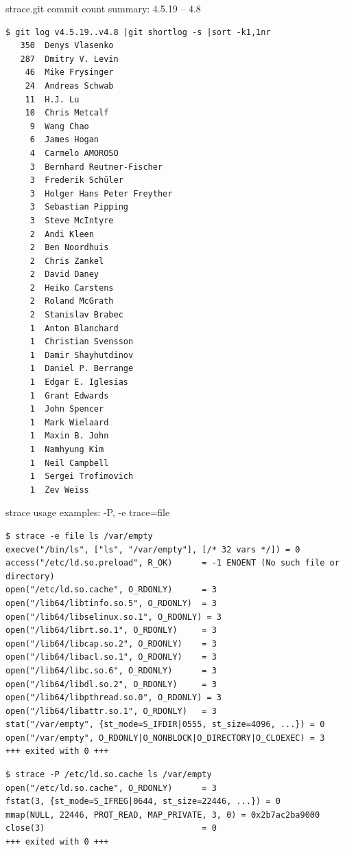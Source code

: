 \documentclass[unicode]{beamer}
\begin{document}
\begin{frame}[fragile]{strace.git commit count summary: 4.5.19 -- 4.8}
\scriptsize
\begin{verbatim}
$ git log v4.5.19..v4.8 |git shortlog -s |sort -k1,1nr
   350	Denys Vlasenko
   287	Dmitry V. Levin
    46	Mike Frysinger
    24	Andreas Schwab
    11	H.J. Lu
    10	Chris Metcalf
     9	Wang Chao
     6	James Hogan
     4	Carmelo AMOROSO
     3	Bernhard Reutner-Fischer
     3	Frederik Schüler
     3	Holger Hans Peter Freyther
     3	Sebastian Pipping
     3	Steve McIntyre
     2	Andi Kleen
     2	Ben Noordhuis
     2	Chris Zankel
     2	David Daney
     2	Heiko Carstens
     2	Roland McGrath
     2	Stanislav Brabec
     1	Anton Blanchard
     1	Christian Svensson
     1	Damir Shayhutdinov
     1	Daniel P. Berrange
     1	Edgar E. Iglesias
     1	Grant Edwards
     1	John Spencer
     1	Mark Wielaard
     1	Maxin B. John
     1	Namhyung Kim
     1	Neil Campbell
     1	Sergei Trofimovich
     1	Zev Weiss
\end{verbatim}
\end{frame}

\begin{frame}[fragile]{strace usage examples: -P, -e trace=file}
\scriptsize
\begin{verbatim}
$ strace -e file ls /var/empty
execve("/bin/ls", ["ls", "/var/empty"], [/* 32 vars */]) = 0
access("/etc/ld.so.preload", R_OK)      = -1 ENOENT (No such file or directory)
open("/etc/ld.so.cache", O_RDONLY)      = 3
open("/lib64/libtinfo.so.5", O_RDONLY)  = 3
open("/lib64/libselinux.so.1", O_RDONLY) = 3
open("/lib64/librt.so.1", O_RDONLY)     = 3
open("/lib64/libcap.so.2", O_RDONLY)    = 3
open("/lib64/libacl.so.1", O_RDONLY)    = 3
open("/lib64/libc.so.6", O_RDONLY)      = 3
open("/lib64/libdl.so.2", O_RDONLY)     = 3
open("/lib64/libpthread.so.0", O_RDONLY) = 3
open("/lib64/libattr.so.1", O_RDONLY)   = 3
stat("/var/empty", {st_mode=S_IFDIR|0555, st_size=4096, ...}) = 0
open("/var/empty", O_RDONLY|O_NONBLOCK|O_DIRECTORY|O_CLOEXEC) = 3
+++ exited with 0 +++
\end{verbatim}

\begin{verbatim}
$ strace -P /etc/ld.so.cache ls /var/empty
open("/etc/ld.so.cache", O_RDONLY)      = 3
fstat(3, {st_mode=S_IFREG|0644, st_size=22446, ...}) = 0
mmap(NULL, 22446, PROT_READ, MAP_PRIVATE, 3, 0) = 0x2b7ac2ba9000
close(3)                                = 0
+++ exited with 0 +++
\end{verbatim}
\end{frame}
\end{document}
